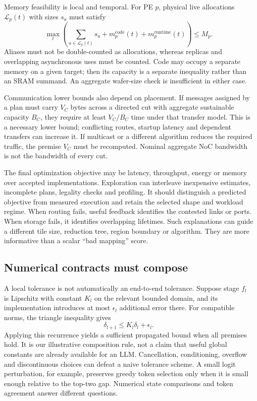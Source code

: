 \documentclass[final,3p,times,authoryear]{elsarticle}
\begin{document}
Memory feasibility is local and temporal. For PE $p$, physical live allocations $\mathcal L_p(t)$ with sizes $s_a$ must satisfy
\begin{equation}\label{eq:local-memory}
 \max_t\left(\sum_{a\in\mathcal L_p(t)}s_a+
        m_p^{\mathrm{code}}(t)+m_p^{\mathrm{runtime}}(t)\right)\le M_p.
\end{equation}
Aliases must not be double-counted as allocations, whereas replicas and overlapping asynchronous uses must be counted. Code may occupy a separate memory on a given target; then its capacity is a separate inequality rather than an SRAM summand. An aggregate wafer-size check is insufficient in either case.

Communication lower bounds also depend on placement. If messages assigned by a plan must carry $V_C$ bytes across a directed cut with aggregate sustainable capacity $B_C$, they require at least $V_C/B_C$ time under that transfer model. This is a necessary lower bound; conflicting routes, startup latency and dependent transfers can increase it. If multicast or a different algorithm reduces the required traffic, the premise $V_C$ must be recomputed. Nominal aggregate NoC bandwidth is not the bandwidth of every cut.

The final optimization objective may be latency, throughput, energy or memory over accepted implementations. Exploration can interleave inexpensive estimates, incomplete plans, legality checks and profiling. It should distinguish a predicted objective from measured execution and retain the selected shape and workload regime. When routing fails, useful feedback identifies the contested links or ports. When storage fails, it identifies overlapping lifetimes. Such explanations can guide a different tile size, reduction tree, region boundary or algorithm. They are more informative than a scalar ``bad mapping'' score.

\subsection{Numerical contracts must compose}
A local tolerance is not automatically an end-to-end tolerance. Suppose stage $f_l$ is Lipschitz with constant $K_l$ on the relevant bounded domain, and its implementation introduces at most $\epsilon_l$ additional error there. For compatible norms, the triangle inequality gives
\begin{equation}\label{eq:error-compose}
 \delta_{l+1}\le K_l\delta_l+\epsilon_l.
\end{equation}
Applying this recurrence yields a sufficient propagated bound when all premises hold. It is our illustrative composition rule, not a claim that useful global constants are already available for an LLM. Cancellation, conditioning, overflow and discontinuous choices can defeat a naive tolerance scheme. A small logit perturbation, for example, preserves greedy token selection only when it is small enough relative to the top-two gap. Numerical state comparisons and token agreement answer different questions.
\end{document}
